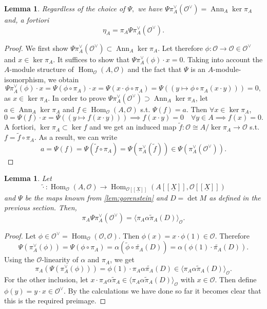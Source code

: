 \documentclass{article}
\theoremstyle{plain}%
\newtheorem{lemma}[theorem]{Lemma}
\theoremstyle{definition}
\theoremstyle{remark}
\newcommand{\ann}{\operatorname{Ann}}
\renewcommand{\hom}{\operatorname{Hom}}
\begin{document}
\begin{lemma}
    Regardless of the choice of \(\Psi,\) we have 
    \(\Psi \pi_A^\vee(\mathcal{O}^\vee) = \ann_A \ker \pi_A\) and, a fortiori
    \[
        \eta_A = \pi_A \Psi \pi_A^\vee(\mathcal{O}^\vee).  
    \]
\end{lemma}
\begin{proof}
    We first show \(\Psi \pi_A^\vee(\mathcal{O}^\vee) \subset \ann_A \ker \pi_A\).
    Let therefore \(\phi\colon \mathcal{O} \to \mathcal{O} \in \mathcal{O}^\vee\) and \(x \in \ker \pi_A\).
    It suffices to show that \(\Psi \pi_A^\vee(\phi) \cdot x = 0\).
    Taking into account the \(A\)-module structure of \(\hom_\mathcal{O}(A, \mathcal{O})\) 
    and the fact that \(\Psi\) is an \(A\)-module-isomorphism, we obtain
    \[
        \Psi \pi_A^\vee(\phi) \cdot x = \Psi(\phi \circ \pi_A) \cdot x = \Psi(x \cdot \phi \circ \pi_A) 
        = \Psi((y \mapsto \phi \circ \pi_A(x\cdot y))) = 0,
    \]
    as \(x \in \ker \pi_A\).
    In order to prove  \(\Psi \pi_A^\vee(\mathcal{O}^\vee) \supset \ann_A \ker \pi_A\), let \(a \in \ann_A \ker \pi_A\)
    and \(f \in \hom_\mathcal{O}(A, \mathcal{O})\) s.t. \(\Psi(f) = a\). Then \(\forall x \in \ker \pi_A\),
    \[
        0 = \Psi(f) \cdot x = \Psi((y \mapsto f(x\cdot y))) \implies f(x\cdot y) = 0\quad \forall y \in A \implies f(x) = 0.
    \]
    A fortiori, \(\ker \pi_A \subset \ker f\) and we get an induced map \(\tilde f\colon \mathcal{O} \cong A/\ker \pi_A \to \mathcal{O}\)
    s.t. \(f = \tilde f \circ \pi_A\). As a result, we can write
    \[
        a = \Psi(f) = \Psi(\tilde f \circ \pi_A) = \Psi(\pi_A^\vee(\tilde f)) \in \Psi(\pi_A^\vee(\mathcal{O}^\vee)).  
    \]
\end{proof}

\begin{lemma}
    Let 
    \[
        \!\tilde{\cdot}\colon \hom_\mathcal{O}(A, \mathcal{O}) \to 
        \hom_{\mathcal{O}[[\underline{X}]]}(A[[\underline{X}]], \mathcal{O}[[\underline{X}]])
    \]
    and \(\Psi\)
    be the maps known from \cref{lem:gorenstein} and \(D = \det M\) as defined in the previous section.
    Then,
    \[
        \pi_A \Psi \pi_A^\vee(\mathcal{O}^\vee) = \langle\pi_A\alpha \tilde \pi_A(D)\rangle_\mathcal{O}.
    \]
\end{lemma}
\begin{proof}
    Let \(\phi \in \mathcal{O}^\vee = \hom_\mathcal{O}(\mathcal{O}, \mathcal{O})\).
    Then \(\phi(x) = x \cdot\phi(1) \in \mathcal{O}\). Therefore 
    \[
        \Psi(\pi_A^\vee(\phi)) = \Psi(\phi \circ \pi_A) = \alpha(\tilde{\phi} \circ \tilde{\pi_A}(D)) = \alpha(\phi(1)\cdot \tilde{\pi_A}(D)).
    \]
    Using the \(\mathcal{O}\)-linearity of \(\alpha\) and \(\pi_A\), we get
    \[
        \pi_A(\Psi(\pi_A^\vee(\phi))) = \phi(1) \cdot \pi_A \alpha \tilde{\pi_A}(D) \in \langle\pi_A\alpha \tilde \pi_A(D)\rangle_\mathcal{O}.
    \]
    For the other inclusion, let \(x\cdot \pi_A\alpha\tilde \pi_A \in \langle\pi_A\alpha \tilde \pi_A(D)\rangle_\mathcal{O}\) 
    with \(x \in \mathcal{O}\). Then define \(\phi(y) = y \cdot x \in \mathcal{O}^\vee\).
    By the calculations we have done so far it becomes clear that this is the required preimage.
\end{proof}
\end{document}
